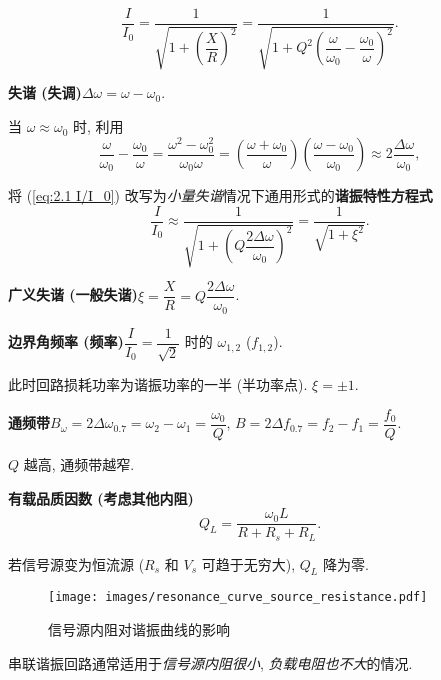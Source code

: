 \begin{equation} \label{eq:2.1 I/I_0}
    \frac{I}{I_0}=\frac{1}{\sqrt{1+\left(\dfrac{X}{R}\right)^2}}=\frac{1}{\sqrt{1+Q^2\left(\dfrac{\omega}{\omega_0}-\dfrac{\omega_0}{\omega}\right)^2}}.
\end{equation}

\textbf{失谐 (失调)}\quad $\Delta\omega=\omega-\omega_0$.

当 $\omega\approx\omega_0$ 时, 利用
\begin{equation*}
    \frac{\omega}{\omega_0}-\frac{\omega_0}{\omega}=\frac{\omega^2-\omega_0^2}{\omega_0\omega}=\left(\frac{\omega+\omega_0}{\omega}\right)\left(\frac{\omega-\omega_0}{\omega_0}\right)\approx 2\frac{\Delta\omega}{\omega_0},
\end{equation*}

\noindent 将 (\ref{eq:2.1 I/I_0}) 改写为\textit{小量失谐}情况下通用形式的\textbf{谐振特性方程式}
\begin{equation} \label{eq:2.1 I/I_0 xi}
    \frac{I}{I_0}\approx\frac{1}{\sqrt{1+\left(Q\dfrac{2\Delta\omega}{\omega_0}\right)^2}}=\frac{1}{\sqrt{1+\xi^2}}.
\end{equation}

\textbf{广义失谐 (一般失谐)}\quad $\xi=\dfrac{X}{R}=Q\dfrac{2\Delta\omega}{\omega_0}$. \label{eq:2.1 xi}

\textbf{边界角频率 (频率)}\quad $\dfrac{I}{I_0}=\dfrac{1}{\sqrt{2}}$ 时的 $\omega_{1,2}$ ($f_{1,2}$).

此时回路损耗功率为谐振功率的一半 (半功率点). $\xi=\pm 1$.

\textbf{通频带}\quad $B_\omega=2\Delta\omega_{0.7}=\omega_2-\omega_1=\dfrac{\omega_0}{Q}$, $B=2\Delta f_{0.7}=f_2-f_1=\dfrac{f_0}{Q}$.

$Q$ 越高, 通频带越窄.

\textbf{有载品质因数 (考虑其他内阻)}
\begin{equation}
    Q_L=\frac{\omega_0L}{R+R_s+R_L}.
\end{equation}

若信号源变为恒流源 ($R_s$ 和 $V_s$ 可趋于无穷大), $Q_L$ 降为零.

\begin{figure}[H]
    \centering
    \texttt{[image: images/resonance\_curve\_source\_resistance.pdf]}
    \caption{信号源内阻对谐振曲线的影响}
\end{figure}

串联谐振回路通常适用于\textit{信号源内阻很小}, \textit{负载电阻也不大}的情况.

